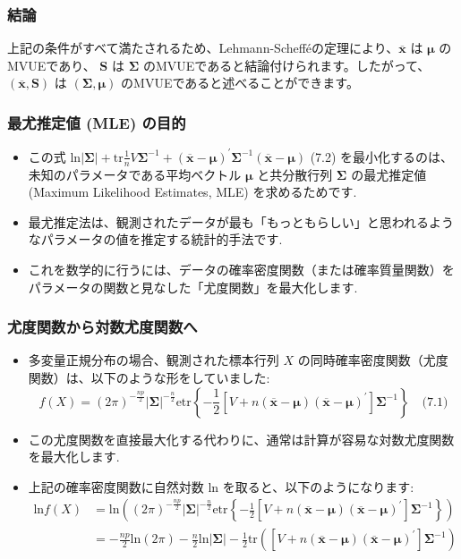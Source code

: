 \documentclass[aspectratio=169]{beamer}
\begin{document}
\begin{frame}
\frametitle{結論}
\begin{block}{}
上記の条件がすべて満たされるため、Lehmann-Schefféの定理により、$\overline{\bm{x}}$ は $\bm{\mu}$ のMVUEであり、 $\bm{S}$ は $\bm{\Sigma}$ のMVUEであると結論付けられます。したがって、$(\overline{\bm{x}},\bm{S})$ は $(\bm{\Sigma},\bm{\mu})$ のMVUEであると述べることができます。
\end{block}
\end{frame}

\begin{frame}
\frametitle{最尤推定値 (MLE) の目的}
\begin{itemize}
    \item この式 $\text{ln}|\bm{\Sigma}|+\text{tr}\frac{1}{n}V\bm{\Sigma}^{-1}+(\overline{\bm{x}}-\bm{\mu})^{\prime}\bm{\Sigma}^{-1}(\overline{\bm{x}}-\bm{\mu})$ (7.2) を最小化するのは、未知のパラメータである平均ベクトル $\bm{\mu}$ と共分散行列 $\bm{\Sigma}$ の最尤推定値 (Maximum Likelihood Estimates, MLE) を求めるためです.
    \item 最尤推定法は、観測されたデータが最も「もっともらしい」と思われるようなパラメータの値を推定する統計的手法です.
    \item これを数学的に行うには、データの確率密度関数（または確率質量関数）をパラメータの関数と見なした「尤度関数」を最大化します.
\end{itemize}
\end{frame}

\begin{frame}
\frametitle{尤度関数から対数尤度関数へ}
\begin{itemize}
    \item 多変量正規分布の場合、観測された標本行列 $X$ の同時確率密度関数（尤度関数）は、以下のような形をしていました:
    \[
    f(X)=(2\pi)^{-\frac{np}{2}}|\bm{\Sigma}|^{-\frac{n}{2}}\text{etr}\left\{-\frac{1}{2}[V+n(\overline{\bm{x}}-\bm{\mu})(\overline{\bm{x}}-\bm{\mu})^{\prime}]\bm{\Sigma}^{-1}\right\} \quad \text{(7.1)} \text{}
    \]
    \item この尤度関数を直接最大化する代わりに、通常は計算が容易な対数尤度関数を最大化します.
    \item 上記の確率密度関数に自然対数 $\text{ln}$ を取ると、以下のようになります:
    \begin{align*}
    \text{ln}f(X)&=\text{ln}\left((2\pi)^{-\frac{np}{2}}|\bm{\Sigma}|^{-\frac{n}{2}}\text{etr}\left\{-\frac{1}{2}[V+n(\overline{\bm{x}}-\bm{\mu})(\overline{\bm{x}}-\bm{\mu})^{\prime}]\bm{\Sigma}^{-1}\right\}\right) \text{} \\
    &=-\frac{np}{2}\text{ln}(2\pi)-\frac{n}{2}\text{ln}|\bm{\Sigma}|-\frac{1}{2}\text{tr}\left([V+n(\overline{\bm{x}}-\bm{\mu})(\overline{\bm{x}}-\bm{\mu})^{\prime}]\bm{\Sigma}^{-1}\right) \text{}
    \end{align*}
\end{itemize}
\end{frame}
\end{document}
